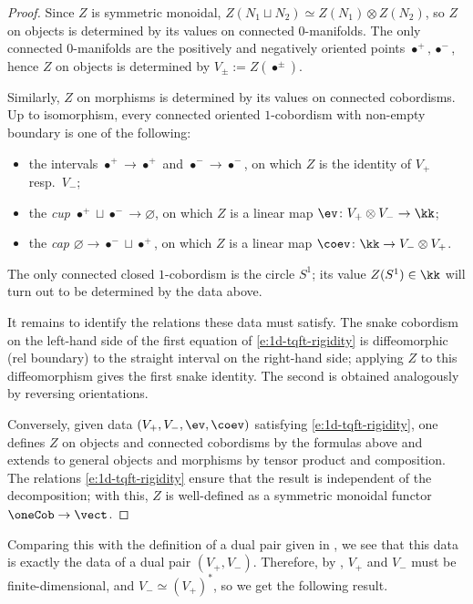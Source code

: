 \begin{proof}
  Since $Z$ is symmetric monoidal,
  $Z(N_1\sqcup N_2)\simeq Z(N_1)\otimes Z(N_2)$, so $Z$ on objects is determined
  by its values on connected 0-manifolds. The only connected 0-manifolds are the
  positively and negatively oriented points $\bullet^+, \bullet^-$, hence $Z$ on
  objects is determined by $V_\pm := Z(\bullet^\pm)$.

  Similarly, $Z$ on morphisms is determined by its values on connected
  cobordisms. Up to isomorphism, every connected oriented $1$-cobordism with
  non-empty boundary is one of the following:
  \begin{itemize}
    \item the intervals $\bullet^+\to\bullet^+$ and $\bullet^-\to\bullet^-$,
      on which $Z$ is the identity of $V_+$ resp.\ $V_-$;
    \item the \emph{cup}
      $\bullet^+\sqcup\bullet^-\to\varnothing$, on which $Z$ is a linear
      map $\ev\colon V_+\otimes V_-\to\kk$;
    \item the \emph{cap}
      $\varnothing\to\bullet^-\sqcup\bullet^+$, on which $Z$ is a linear
      map $\coev\colon \kk\to V_-\otimes V_+$.
  \end{itemize}
  The only connected closed $1$-cobordism is the circle $S^1$; its value
  $Z(S^1)\in\kk$ will turn out to be determined by the data above.

  It remains to identify the relations these data must satisfy. The snake
  cobordism on the left-hand side of the first equation of
  \eqref{e:1d-tqft-rigidity} is diffeomorphic (rel boundary) to the straight
  interval on the right-hand side; applying $Z$ to this diffeomorphism gives
  the first snake identity. The second is obtained analogously by reversing
  orientations.

  Conversely, given data $(V_+, V_-, \ev, \coev)$ satisfying
  \eqref{e:1d-tqft-rigidity}, one defines $Z$ on objects and connected
  cobordisms by the formulas above and extends to general objects and
  morphisms by tensor product and composition. The relations
  \eqref{e:1d-tqft-rigidity} ensure that the result is independent of the
  decomposition; with this, $Z$ is well-defined as a symmetric monoidal
  functor $\oneCob\to\vect$.
\end{proof}

Comparing this with the definition of a dual pair given in , we
see that this data is exactly the data of a dual pair $(V_+, V_-)$. Therefore,
by , $V_+$ and $V_-$ must be finite-dimensional, and
$V_-\simeq (V_+)^*$, so we get the following result.

